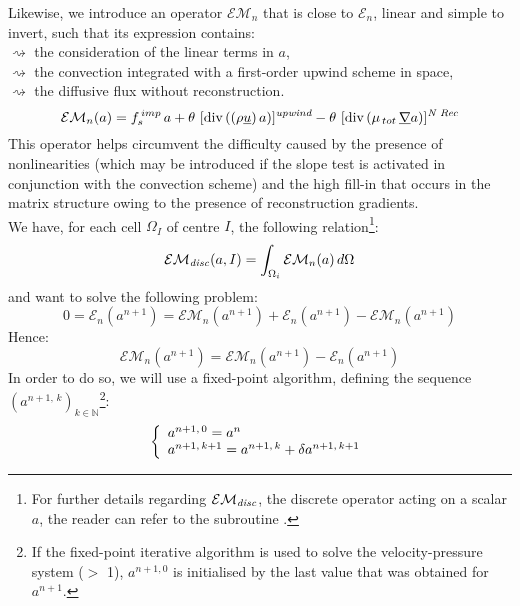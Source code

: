 Likewise, we introduce an operator $\mathcal{EM}_{n}$ that is close to
$\mathcal{E}_{n}$, linear and simple to invert, such that its
expression contains:\\
\hspace*{1.cm}$\rightsquigarrow$ the consideration of the linear terms in $a$,\\
\hspace*{1.cm}$\rightsquigarrow$ the convection integrated with a first-order upwind scheme in space,\\
\hspace*{1.cm}$\rightsquigarrow$ the diffusive flux without reconstruction.\\
\begin{equation}
\mathcal{EM}_{n}(a) = f_s^{\,imp}\,a + \theta\,\,[\text{div}\,((\rho
\underline{u})\,a)]^{\textit{upwind}} - \theta\,\, [\text{div}\,(\mu_{\,tot}\,\underline{\nabla} a)]^{\textit{N Rec}}
\end{equation}
This operator helps circumvent the difficulty caused by the presence of nonlinearities (which may be introduced if the slope test is activated in conjunction with the convection scheme) and the high fill-in that occurs in the matrix structure owing to the presence of reconstruction gradients.\\
We have, for each cell $\Omega_I$ of centre $I$, the following relation\footnote{For further details regarding $\mathcal{EM_{\it{disc}}}$, the discrete operator acting on a scalar $a$, the reader can refer to the subroutine
.}:
\begin{equation}\notag
\mathcal{EM_{\it{disc}}}(a,I) = \int_{\Omega_i}\mathcal{EM}_{n}(a)  \, d\Omega
\end{equation}
and want to solve the following problem:
\begin{equation}
0 =\mathcal{E}_{n}(a^{n+1}) =  \mathcal{EM}_{n}(a^{n+1}) +  \mathcal{E}_{n}(a^{n+1}) - \mathcal{EM}_{n}(a^{n+1})
\end{equation}
Hence:
\begin{equation}
\mathcal{EM}_{n}(a^{n+1}) =  \mathcal{EM}_{n}(a^{n+1}) -  \mathcal{E}_{n}(a^{n+1})
\end{equation}
In order to do so, we will use a fixed-point algorithm, defining the
sequence $(a^{n+1,\,k})_{k\in \mathbb{N}}$\footnote{If the fixed-point iterative algorithm is used
to solve the velocity-pressure system ($>$ 1), $a^{n+1,0}$ is initialised by
the last value that was obtained for $a^{n+1}$.}:
\begin{equation}\notag
\left\{\begin{array}{l}
a^{n+1,\,0} = a^{n}\\
a^{n+1,\,k+1} = a^{n+1,\,k} + \delta a^{n+1,\,k+1}
\end{array}\right.
\end{equation}
